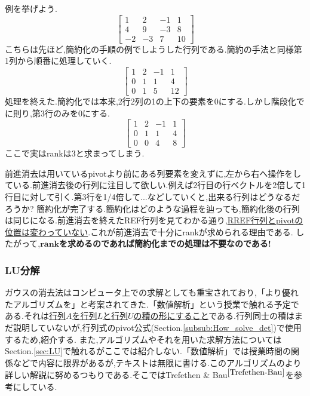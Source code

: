 例を挙げよう.
\[
\begin{bmatrix}
    1& 2 & -1 & 1 \\
    4 & 9 & -3 & 8 \\
    -2 & -3 & 7 & 10
\end{bmatrix}
\]
こちらは先ほど,簡約化の手順の例でしようした行列である.簡約の手法と同様第1列から順番に処理していく.
\[
\begin{bmatrix}
    1& 2 & -1 & 1 \\
    0 & 1 & 1 & 4 \\
    0 & 1 & 5 & 12
\end{bmatrix}
\]
処理を終えた.簡約化では本来,2行2列の1の上下の要素を0にする.しかし階段化でに則り,第3行のみを0にする.
\[
\begin{bmatrix}
    1& 2 & -1 & 1 \\
    0 & 1 & 1 & 4 \\
    0 & 0 & 4 & 8
\end{bmatrix}
\]
ここで実はrankは3と求まってしまう.

前進消去は用いているpivotより前にある列要素を変えずに,左から右へ操作をしている.前進消去後の行列に注目して欲しい.例えば2行目の行ベクトルを2倍して1行目に対して引く.第3行を1/4倍して...などしていくと,出来る行列はどうなるだろうか?
簡約化が完了する.簡約化はどのような過程を辿っても,簡約化後の行列は同じになる.前進消去を終えたREF行列を見てわかる通り,\underline{RREF行列とpivotの位置は変わっていない}.これが前進消去で十分にrankが求められる理由である.
したがって,\textbf{$\textbf{rank}$を求めるのであれば簡約化までの処理は不要なのである!}
\subsubsection{LU分解}\label{subsub:LU_and_P}
ガウスの消去法はコンピュータ上での求解としても重宝されており,「より優れたアルゴリズムを」と考案されてきた.「数値解析」という授業で触れる予定である.それは\underline{行列$A$を行列$L$と行列$U$の積の形にすること}である.行列同士の積はまだ説明していないが,行列式のpivot公式(Section.\ref{subsub:How_solve_det})で使用するため,紹介する.
また,アルゴリズムやそれを用いた求解方法についてはSection.\ref{sec:LU}で触れるがここでは紹介しない.「数値解析」では授業時間の関係などで内容に限界があるが,テキストは無限に書ける.このアルゴリズムのより詳しい解説に努めるつもりである.そこではTrefethen \& Bau$^{\cite{Trefethen-Bau}}$を参考にしている.

